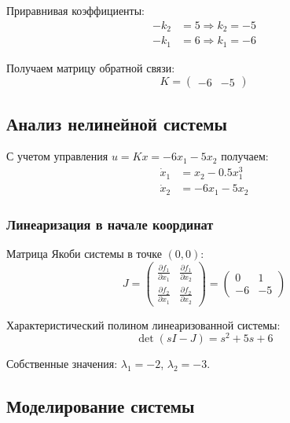 Приравнивая коэффициенты:
\begin{align}
-k_2 &= 5 \Rightarrow k_2 = -5 \\
-k_1 &= 6 \Rightarrow k_1 = -6
\end{align}

Получаем матрицу обратной связи:
\begin{equation}
K = \begin{pmatrix} -6 & -5 \end{pmatrix}
\end{equation}

\subsection*{Анализ нелинейной системы}

С учетом управления $u = Kx = -6x_1 - 5x_2$ получаем:
\begin{align}
\dot{x}_1 &= x_2 - 0.5x_1^3 \\
\dot{x}_2 &= -6x_1 - 5x_2
\end{align}

\subsubsection*{Линеаризация в начале координат}

Матрица Якоби системы в точке $(0,0)$:
\begin{equation}
J = \begin{pmatrix} 
\frac{\partial f_1}{\partial x_1} & \frac{\partial f_1}{\partial x_2} \\
\frac{\partial f_2}{\partial x_1} & \frac{\partial f_2}{\partial x_2}
\end{pmatrix} = \begin{pmatrix} 
0 & 1 \\
-6 & -5
\end{pmatrix}
\end{equation}

Характеристический полином линеаризованной системы:
\begin{equation}
\det(sI - J) = s^2 + 5s + 6
\end{equation}

Собственные значения: $\lambda_1 = -2$, $\lambda_2 = -3$.

\subsection*{Моделирование системы}

